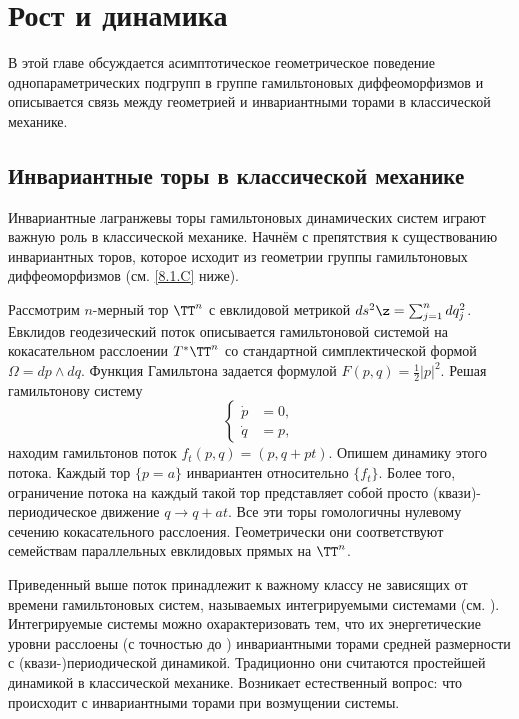 \chapter{Рост и динамика}

В этой главе обсуждается асимптотическое геометрическое поведение однопараметрических подгрупп в группе гамильтоновых диффеоморфизмов и описывается связь между геометрией и инвариантными торами в классической механике.

\section{Инвариантные торы в классической механике}

Инвариантные лагранжевы торы гамильтоновых динамических систем играют важную роль в классической механике.
Начнём с препятствия к существованию инвариантных торов, которое исходит из геометрии группы гамильтоновых диффеоморфизмов (см. \ref{8.1.C} ниже).

Рассмотрим $n$-мерный тор $\TT^n$ с евклидовой метрикой $ds^2 \z= \sum^n_{j = 1} dq_j^2$.
Евклидов геодезический поток описывается гамильтоновой системой на кокасательном расслоении $T^\ast \TT^n$ со стандартной симплектической формой $\Omega = dp \wedge dq$.
Функция Гамильтона задается формулой $F (p, q) = \tfrac12 | p |^2$.
Решая гамильтонову систему 
\[
\begin{cases}
\dot p &= 0,\\
\dot q &= p,
\end{cases}
\]
находим гамильтонов поток $f_t (p, q) = (p, q + pt)$.
Опишем динамику этого потока.
Каждый тор $\{p = a\}$ инвариантен относительно $\{f_t\}$. 
Более того, ограничение потока на каждый такой тор представляет собой просто (квази)-периодическое движение $q \to q + at$.
Все эти торы гомологичны нулевому сечению кокасательного расслоения.
Геометрически они соответствуют семействам параллельных евклидовых прямых на $\TT^n$.

Приведенный выше поток принадлежит к важному классу не зависящих от времени гамильтоновых систем, называемых интегрируемыми системами (см. \cite{Ar}).
Интегрируемые системы можно охарактеризовать тем, что их энергетические уровни расслоены (с точностью до ) инвариантными торами средней размерности с (квази-)периодической динамикой.
Традиционно они считаются простейшей динамикой в классической механике.
Возникает естественный вопрос: что происходит с инвариантными торами при возмущении системы.

